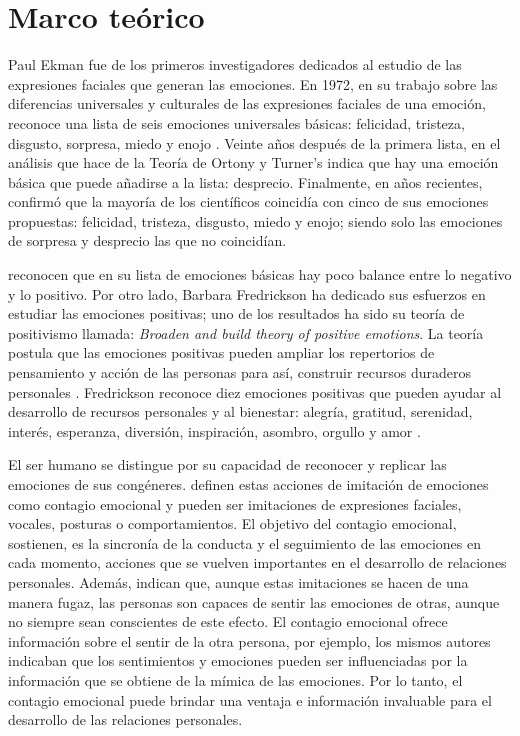 \documentclass[spanish]{textolivre}
\begin{document}
\section{Marco teórico}\label{sec-marco}
Paul Ekman fue de los primeros investigadores dedicados al estudio de las expresiones faciales que generan las emociones. En 1972, en su trabajo sobre las diferencias universales y culturales de las expresiones faciales de una emoción, reconoce una lista de seis emociones universales básicas: felicidad, tristeza, disgusto, sorpresa, miedo y enojo \cite{ekman1972}. Veinte años después de la primera lista, \textcite{ekman1992} en el análisis que hace de la Teoría de Ortony y Turner’s indica que hay una emoción básica que puede añadirse a la lista: desprecio. Finalmente, en años recientes, \textcite{ekman2016} confirmó que la mayoría de los científicos coincidía con cinco de sus emociones propuestas: felicidad, tristeza, disgusto, miedo y enojo; siendo solo las emociones de sorpresa y desprecio las que no coincidían. 

\textcite{ekman2011} reconocen que en su lista de emociones básicas hay poco balance entre lo negativo y lo positivo. Por otro lado, Barbara Fredrickson ha dedicado sus esfuerzos en estudiar las emociones positivas; uno de los resultados ha sido su teoría de positivismo llamada: \textit{Broaden and build theory of positive emotions}. La teoría postula que las emociones positivas pueden ampliar los repertorios de pensamiento y acción de las personas para así, construir recursos duraderos personales \cite{fredrickson2004}. Fredrickson reconoce diez emociones positivas que pueden ayudar al desarrollo de recursos personales y al bienestar: alegría, gratitud, serenidad, interés, esperanza, diversión, inspiración, asombro, orgullo y amor \cite{fredrickson2013}. 

El ser humano se distingue por su capacidad de reconocer y replicar las emociones de sus congéneres. \textcite{hatfield1993} definen estas acciones de imitación de emociones como contagio emocional y pueden ser imitaciones de expresiones faciales, vocales, posturas o comportamientos. El objetivo del contagio emocional, sostienen, es la sincronía de la conducta y el seguimiento de las emociones en cada momento, acciones que se vuelven importantes en el desarrollo de relaciones personales. Además, indican que, aunque estas imitaciones se hacen de una manera fugaz, las personas son capaces de sentir las emociones de otras, aunque no siempre sean conscientes de este efecto. El contagio emocional ofrece información sobre el sentir de la otra persona, por ejemplo, los mismos autores indicaban que los sentimientos y emociones pueden ser influenciadas por la información que se obtiene de la mímica de las emociones.  Por lo tanto, el contagio emocional puede brindar una ventaja e información invaluable para el desarrollo de las relaciones personales.  
\end{document}

